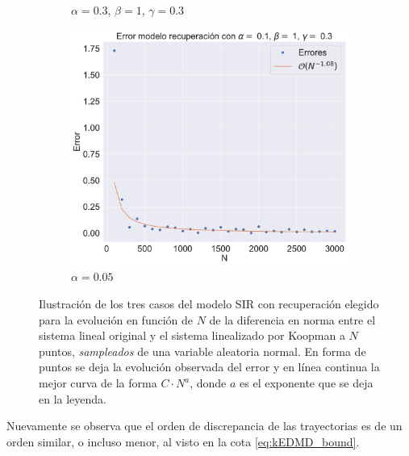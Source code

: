 \begin{figure}[h]
\begin{subfigure}[b]{0.32\textwidth}
        \caption{$\alpha=0.3$, $\beta=1$, $\gamma=0.3$}
    \end{subfigure}
    \hfill
    \begin{subfigure}[b]{0.32\textwidth}
        \centering
        \includegraphics[width=\textwidth]{img/content/chapter3/SIR_rec3Errors.pdf}
        \caption{$\alpha=0.05$}
    \end{subfigure}
    \caption{Ilustración de los tres casos del modelo SIR con recuperación elegido para la evolución en función de $N$ de la diferencia en norma entre el sistema lineal original y el sistema linealizado por Koopman a $N$ puntos,  \textit{sampleados} de una variable aleatoria normal. En forma de puntos se deja la evolución observada del error y en línea continua la mejor curva de la forma $C \cdot N^{a}$, donde $a$ es el exponente que se deja en la leyenda.}
    \label{fig:ErrorSIR_rec}
\end{figure}
Nuevamente se observa que el orden de discrepancia de las trayectorias es de un orden similar, o incluso menor, al visto en la cota \ref{eq:kEDMD_bound}.